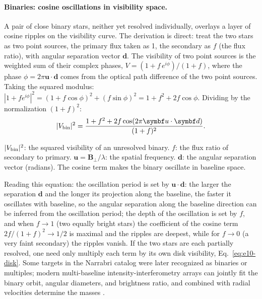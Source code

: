 \paragraph{Binaries: cosine oscillations in visibility space.}
\label{sec:e17-binary}

A pair of close binary stars, neither yet resolved individually, overlays a layer of cosine ripples on the visibility curve. The derivation is direct: treat the two stars as two point sources, the primary flux taken as 1, the secondary as \(f\) (the flux ratio), with angular separation vector \(\bm{d}\). The visibility of two point sources is the weighted sum of their complex phases, \(V=(1+f\,e^{i\phi})/(1+f)\), where the phase \(\phi=2\pi\bm{u}\cdot\bm{d}\) comes from the optical path difference of the two point sources. Taking the squared modulus: \(|1+f e^{i\phi}|^2=(1+f\cos\phi)^2+(f\sin\phi)^2=1+f^2+2f\cos\phi\). Dividing by the normalization \((1+f)^2\):
\begin{equation}
  |V_{\rm bin}|^2=
  \frac{1+f^2+2f\cos(2\pi\bm{u}\cdot\bm{d})}
       {(1+f)^2}.
  \label{eq:e17-binary}
\end{equation}
\begin{formulaexplain}
\(|V_{\rm bin}|^2\): the squared visibility of an unresolved binary. \(f\): the flux ratio of secondary to primary. \(\bm{u}=\bm{B}_\perp/\lambda\): the spatial frequency. \(\bm{d}\): the angular separation vector (radians). The cosine term makes the binary oscillate in baseline space.
\end{formulaexplain}
Reading this equation: the oscillation period is set by \(\bm{u}\cdot\bm{d}\): the larger the separation \(\bm{d}\) and the longer its projection along the baseline, the faster it oscillates with baseline, so the angular separation along the baseline direction can be inferred from the oscillation period; the depth of the oscillation is set by \(f\), and when \(f\to1\) (two equally bright stars) the coefficient of the cosine term \(2f/(1+f)^2\to1/2\) is maximal and the ripples are deepest, while for \(f\to0\) (a very faint secondary) the ripples vanish. If the two stars are each partially resolved, one need only multiply each term by its own disk visibility, Eq.~\eqref{eq:e10-disk}. Some targets in the Narrabri catalog were later recognized as binaries or multiples; modern multi-baseline intensity-interferometry arrays can jointly fit the binary orbit, angular diameters, and brightness ratio, and combined with radial velocities determine the masses \citep{1970MNRAS.148..103H,1974MNRAS.167..121H,2012MNRAS.419..172N}.

